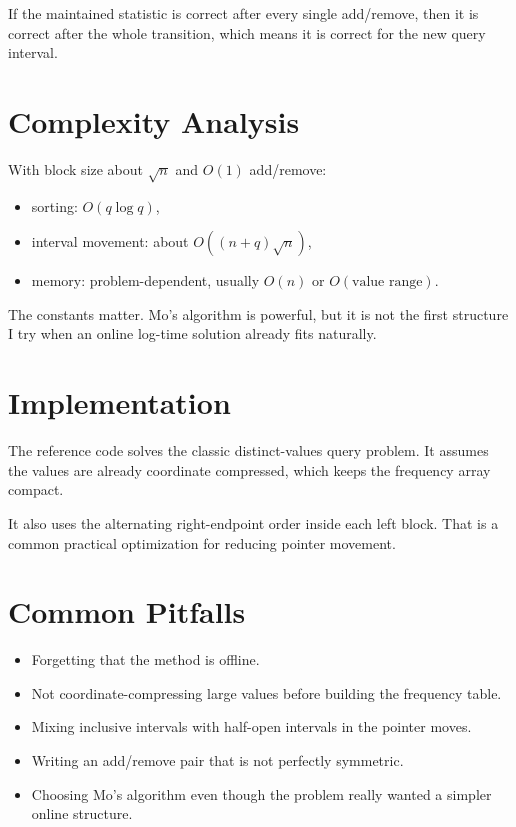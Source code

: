 If the maintained statistic is correct after every single add/remove, then it is correct after the whole transition,
which means it is correct for the new query interval.

\section*{Complexity Analysis}

With block size about \(\sqrt{n}\) and \(O(1)\) add/remove:

\begin{itemize}
  \item sorting: \(O(q \log q)\),
  \item interval movement: about \(O((n + q)\sqrt{n})\),
  \item memory: problem-dependent, usually \(O(n)\) or \(O(\text{value range})\).
\end{itemize}

The constants matter. Mo's algorithm is powerful, but it is not the first structure I try when an online log-time
solution already fits naturally.

\section*{Implementation}

The reference code solves the classic distinct-values query problem. It assumes the values are already coordinate
compressed, which keeps the frequency array compact.

It also uses the alternating right-endpoint order inside each left block. That is a common practical optimization for
reducing pointer movement.

\section*{Common Pitfalls}

\begin{itemize}
  \item Forgetting that the method is offline.
  \item Not coordinate-compressing large values before building the frequency table.
  \item Mixing inclusive intervals with half-open intervals in the pointer moves.
  \item Writing an add/remove pair that is not perfectly symmetric.
  \item Choosing Mo's algorithm even though the problem really wanted a simpler online structure.
\end{itemize}

